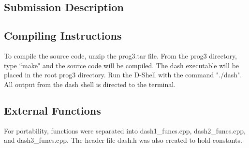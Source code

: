 \documentclass[11pt]{article}
\begin{document}
\begin{multicols}{2}
\section{Submission Description}\label{submission_description}
\subsection{Compiling Instructions}
To compile the source code, unzip the prog3.tar file. From the prog3 directory, type ``make" and the source code will be compiled. The dash executable will be placed in the root prog3 directory. Run the D-Shell with the command "./dash". All output from the dash shell is directed to the terminal.

\subsection{External Functions}
For portability, functions were separated into dash1\_funcs.cpp, dash2\_funcs.cpp, and dash3\_funcs.cpp. The header file dash.h was also created to hold constants.

\end{multicols}

\end{document}
